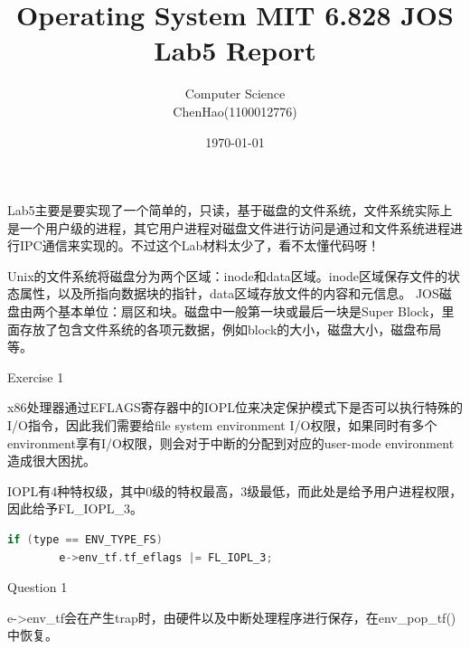 \documentclass[GBK,winfonts,a4paper,10pt]{ctexart}
\begin{document}
\rhead{}
\lhead{}
\cfoot{\thepage}
\renewcommand{\footrulewidth}{0.4pt}
\renewcommand{\algorithmicrequire}{\textbf{Input:}}
\renewcommand{\algorithmicensure}{\textbf{Output:}}
\setlength{\tabcolsep}{2pt}

\setlength{\parindent}{2em}

\thispagestyle{fancy}


\title{Operating System MIT 6.828 JOS Lab5 Report}
\author{Computer Science \\ ChenHao(1100012776) }
\date{\today}
\maketitle

\thispagestyle{fancy}

\tableofcontents

\newpage

\par
Lab5主要是要实现了一个简单的，只读，基于磁盘的文件系统，文件系统实际上是一个用户级的进程，其它用户进程对磁盘文件进行访问是通过和文件系统进程进行IPC通信来实现的。不过这个Lab材料太少了，看不太懂代码呀！
\par
Unix的文件系统将磁盘分为两个区域：inode和data区域。inode区域保存文件的状态属性，以及所指向数据块的指针，data区域存放文件的内容和元信息。
JOS磁盘由两个基本单位：扇区和块。磁盘中一般第一块或最后一块是Super Block，里面存放了包含文件系统的各项元数据，例如block的大小，磁盘大小，磁盘布局等。
\begin{section}{ Exercise 1 }
\par
x86处理器通过EFLAGS寄存器中的IOPL位来决定保护模式下是否可以执行特殊的I/O指令，因此我们需要给file system environment I/O权限，如果同时有多个environment享有I/O权限，则会对于中断的分配到对应的user-mode environment造成很大困扰。
\par
IOPL有4种特权级，其中0级的特权最高，3级最低，而此处是给予用户进程权限，因此给予FL\_IOPL\_3。
\begin{lstlisting}[language=C]
    if (type == ENV_TYPE_FS)
        e->env_tf.tf_eflags |= FL_IOPL_3;        
\end{lstlisting}
\end{section}

\begin{section}{ Question 1 }
\par
e->env\_tf会在产生trap时，由硬件以及中断处理程序进行保存，在env\_pop\_tf()中恢复。
\end{section}
\end{document}
